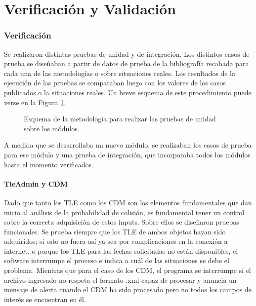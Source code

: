 \section{Verificaci\'on y Validaci\'on}\label{sec:vandv}

\subsubsection*{Verificaci\'on}
Se realizaron distintas pruebas de unidad y de integraci\'on.  
Los distintos casos de prueba se diseñaban a partir de datos de prueba de la bibliograf\'ia recabada para cada una de las metodolog\'ias o sobre situaciones reales. Los resultados de la ejecución de las pruebas se comparaban luego con los valores de los casos publicados o la situaciones reales. Un breve esquema de este procedimiento puede verse en la Figura \ref{fig:metodoprueba}. 

\begin{figure}[h!]
  \centering
  \caption{Esquema de la metodología para realizar las pruebas de unidad sobre los módulos.}
  \label{fig:metodoprueba}
\end{figure}

A medida que se desarrollaba un nuevo m\'odulo, se realizaban los casos de prueba para ese m\'odulo y una prueba de integraci\'on, que incorporaba todos los m\'odulos hasta el momento verificados.

\paragraph*{TleAdmin y CDM}
Dado que tanto los TLE como los CDM son los elementos fundamentales que dan inicio al an\'alisis de la probabilidad de colisi\'on, es fundamental tener un control sobre la correcta adquisici\'on de estos inputs. Sobre ellos se diseñaron pruebas funcionales. Se prueba siempre que los TLE de ambos objetos hayan sido adquiridos; si esto no fuera as\'i ya sea por complicaciones en la conexi\'on a internet, o porque los TLE para las fechas solicitadas no est\'an disponibles, el software interrumpe el proceso e indica a cu\'al de las situaciones se debe el problema. Mientras que para el caso de los CDM, el programa se interrumpe si el archivo ingresado no respeta el formato .xml capaz de procesar y anuncia un mensaje de alerta cuando el CDM ha sido procesado pero no todos los campos de inter\'es se encuentran en \'el. 


